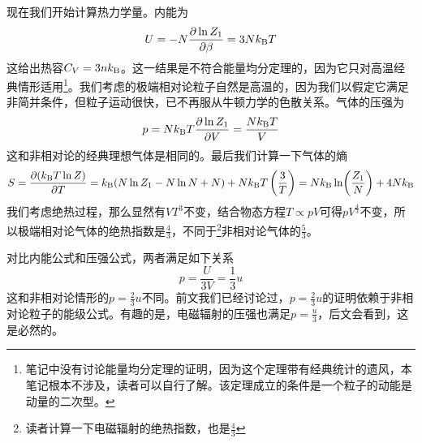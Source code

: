 \documentclass[../../main.tex]{subfiles}
\begin{document}
现在我们开始计算热力学量。内能为
\begin{equation}
    U=-N\pdv{\ln Z_1}{\beta}=3Nk_{\mathrm{B}} T
\end{equation}
这给出热容\(C_V=3nk_{\mathrm{B}}\)。这一结果是不符合能量均分定理的，因为它只对高温经典情形适用\footnote{笔记中没有讨论能量均分定理的证明，因为这个定理带有经典统计的遗风，本笔记根本不涉及，读者可以自行了解。该定理成立的条件是一个粒子的动能是动量的二次型。}。我们考虑的极端相对论粒子自然是高温的，因为我们以假定它满足非简并条件，但粒子运动很快，已不再服从牛顿力学的色散关系。气体的压强为
\begin{equation}
    p=Nk_{\mathrm{B}} T\pdv{\ln Z_1}{V}=\frac{Nk_{\mathrm{B}} T}{V}
\end{equation}
这和非相对论的经典理想气体是相同的。最后我们计算一下气体的熵
\begin{equation}
    S=\pdv{(k_{\mathrm{B}}T\ln Z)}{T}=k_{\mathrm{B}}(N\ln Z_1-N\ln N+N)+Nk_{\mathrm{B}} T\left(\frac{3}{T}\right)=Nk_{\mathrm{B}}\ln(\frac{Z_1}{N})+4Nk_{\mathrm{B}}
\end{equation}
我们考虑绝热过程，那么显然有\(VT^3\)不变，结合物态方程\(T\propto pV\)可得\(pV^{\frac{4}{3}}\)不变，所以极端相对论气体的绝热指数是\(\frac{4}{3}\)，不同于\footnote{读者计算一下电磁辐射的绝热指数，也是\(\frac{4}{3}\)}非相对论气体的\(\frac{5}{3}\)。

对比内能公式和压强公式，两者满足如下关系
\begin{equation}\label{eq:非简并极端相对论粒子压-内关系}
    p=\frac{U}{3V}=\frac{1}{3}u
\end{equation}
这和非相对论情形的\(p=\frac{2}{3}u\)不同。前文我们已经讨论过，\(p=\frac{2}{3}u\)的证明依赖于非相对论粒子的能级公式。有趣的是，电磁辐射的压强也满足\(p=\frac{u}{3}\)，后文会看到，这是必然的。
\end{document}
